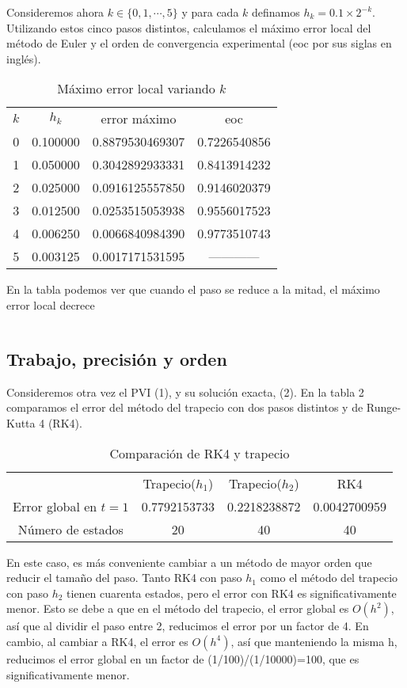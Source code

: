 \documentclass[11pt]{article}
\begin{document}
Consideremos ahora $k \in \{0, 1, \cdots, 5\}$ y para cada $k$ definamos $h_k =
0.1 \times 2^{-k}$.  Utilizando estos cinco pasos distintos, calculamos el máximo
error local del método de Euler y el orden de convergencia experimental (eoc por sus 
siglas en inglés).

\begin{table}[h]
\caption{Máximo error local variando $k$}
\centering
\begin{tabular}{cccc}
\hline \hline
$k$ & $h_k$ & error máximo & eoc \\ [0.5ex]
0 & 0.100000 &  0.8879530469307 & 0.7226540856 \\
1 & 0.050000 & 0.3042892933331 & 0.8413914232 \\
2 & 0.025000 & 0.0916125557850 & 0.9146020379 \\
3 & 0.012500 & 0.0253515053938 & 0.9556017523 \\
4 & 0.006250 & 0.0066840984390 & 0.9773510743 \\
5 & 0.003125 & 0.0017171531595 & ------------ \\
\hline
\end{tabular}
\label{tab:hresult}
\end{table}
En la tabla podemos ver que cuando el paso se reduce a la mitad, el máximo
error local decrece

$ $\\ 

\noindent
\subsection{Trabajo, precisión y orden}
Consideremos otra vez el PVI (1), y su solución exacta, (2). En la tabla 2 comparamos
el error del método del trapecio con dos pasos distintos y de Runge-Kutta 4 (RK4). 

\begin{table}[h]
\caption{Comparación de RK4 y trapecio}
\centering
\begin{tabular}{cccc}
\hline \hline
$ $ & Trapecio($h_1$) & Trapecio($h_2$) & RK4 \\
Error global en $t=1$ & 0.7792153733  &  0.2218238872 & 0.0042700959 \\
Número de estados  &     20       &       40       &       40 \\
\hline
\end{tabular}
\end{table}
En este caso, es más conveniente cambiar a un método de mayor orden que reducir el
tamaño del paso. Tanto RK4 con paso $h_1$ como el método del trapecio con paso 
$h_2$ tienen cuarenta estados, pero el error con RK4 es significativamente menor.
Esto se debe a que en el método del trapecio, el error global es $O(h^2)$, así que al 
dividir el paso entre 2, reducimos el error por un factor de 4. En cambio, al 
cambiar a RK4, el error es $O(h^4)$, así que manteniendo  la misma h, reducimos el 
error global en un factor de (1/100)/(1/10000)=100, que es significativamente menor.
\end{document}
